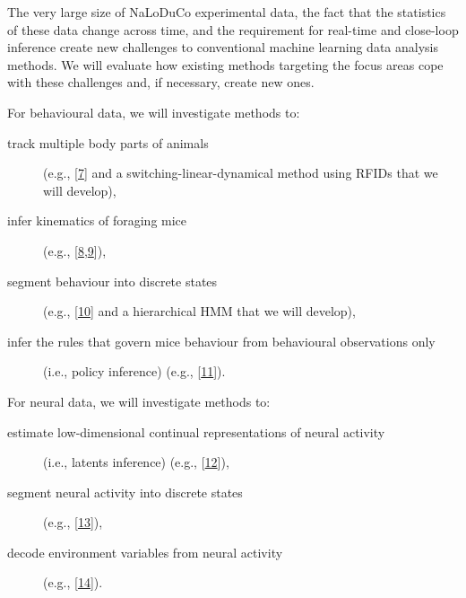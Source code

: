 The very large size of NaLoDuCo experimental data, the fact that the statistics
of these data change across time, and the requirement for real-time and
close-loop inference create new challenges to conventional machine learning
data analysis methods.
%
We will evaluate how existing methods targeting the focus areas cope with these
challenges and, if necessary, create new ones.

For behavioural data, we will investigate methods to:

\begin{description}

    \item[track multiple body parts of animals] (e.g.,
        [\href{https://pubmed.ncbi.nlm.nih.gov/30127430/}{7}] and a
        switching-linear-dynamical method using RFIDs that we will develop),

    \item[infer kinematics of foraging mice] (e.g.,
        [\href{https://github.com/joacorapela/lds\_python}{8},\href{https://www.cambridge.org/core/books/fundamentals-of-object-tracking/A543B0EA12957B353BE4B5D0602EE945}{9}]),

    \item[segment behaviour into discrete states] (e.g.,
        [\href{https://pubmed.ncbi.nlm.nih.gov/26687221/}{10}]
        and a hierarchical HMM that we will develop),

    \item[infer the rules that govern mice behaviour from behavioural
        observations only] (i.e., policy inference) (e.g.,
        [\href{https://arxiv.org/abs/2311.13870v2}{11}]).

\end{description}

For neural data, we will investigate methods to:

\begin{description}

    \item[estimate low-dimensional continual representations of neural
        activity]
        (i.e., latents inference) (e.g.,
        [\href{https://papers.nips.cc/paper_files/paper/2011/hash/7143d7fbadfa4693b9eec507d9d37443-Abstract.html}{12}]),

    \item[segment neural activity into discrete states] (e.g.,
        [\href{https://pubmed.ncbi.nlm.nih.gov/21299424/}{13}]),

    \item[decode environment variables from neural activity] (e.g.,
        [\href{https://pubmed.ncbi.nlm.nih.gov/25973549/}{14}]).

\end{description}
